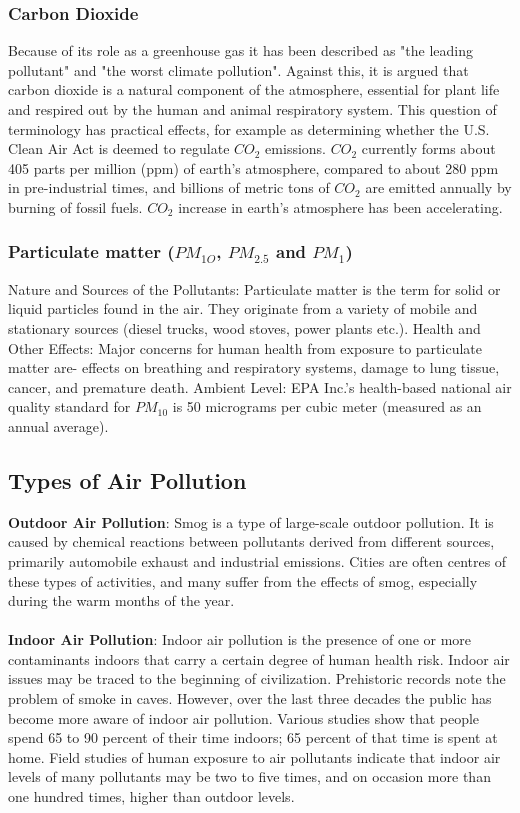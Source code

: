 \subsubsection{Carbon Dioxide}
Because of its role as a greenhouse gas it has been described as "the leading pollutant" and "the worst climate pollution". Against this, it is argued that carbon dioxide is a natural component of the atmosphere, essential for plant life and respired out by the human and animal respiratory system. This question of terminology has practical effects, for example as determining whether the U.S. Clean Air Act is deemed to regulate $CO_2$ emissions. $CO_2$ currently forms about 405 parts per million (ppm) of earth's atmosphere, compared to about 280 ppm in pre-industrial times, and billions of metric tons of $CO_2$ are emitted annually by burning of fossil fuels. $CO_2$ increase in earth's atmosphere has been accelerating.

\subsubsection{Particulate matter ($PM_{1O}$, $PM_{2.5}$ and $PM_1$)}
Nature and Sources of the Pollutants: Particulate matter is the term for solid or liquid particles found in the air. They originate from a variety of mobile and stationary sources (diesel trucks, wood stoves, power plants etc.).
Health and Other Effects: Major concerns for human health from exposure to particulate matter are- effects on breathing and respiratory systems, damage to lung tissue, cancer, and premature death. 
Ambient Level: EPA Inc.'s health-based national air quality standard for $PM_{10}$ is 50 micrograms per cubic meter (measured as an annual average).

\subsection{Types of Air Pollution}
\textbf{Outdoor Air Pollution}:
Smog is a type of large-scale outdoor pollution. It is caused by chemical reactions between pollutants derived from different sources, primarily automobile exhaust and industrial emissions. Cities are often centres of these types of activities, and many suffer from the effects of smog, especially during the warm months of the year.
\\
\\
\textbf{Indoor Air Pollution}:
Indoor air pollution is the presence of one or more contaminants indoors that carry a certain degree of human health risk. Indoor air issues may be traced to the beginning of civilization. Prehistoric records note the problem of smoke in caves. However, over the last three decades the public has become more aware of indoor air pollution. Various studies show that people spend 65 to 90 percent of their time indoors; 65 percent of that time is spent at home. Field studies of human exposure to air pollutants indicate that indoor air levels of many pollutants may be two to five times, and on occasion more than one hundred times, higher than outdoor levels.

